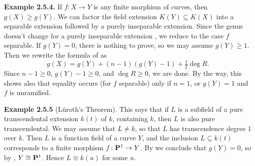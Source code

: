 {\medskip
\noindent\hypertarget{result-IV-2.5.4}{}\textbf{Example 2.5.4.} If $f\colon X\to Y$ is any finite morphism of curves, then $g(X)\geq g(Y)$. We can factor the field extension $K(Y)\subseteq K(X)$ into a separable extension followed by a purely inseparable extension. Since the genus doesn't change for a purely inseparable extension , we reduce to the case $f$ separable. If $g(Y)=0$, there is nothing to prove, so we may assume $g(Y)\geq1$. Then we rewrite the formula of  as
\[
g(X)=g(Y)+(n-1)(g(Y)-1)+\tfrac12\deg R.
\]
Since $n-1\geq0$, $g(Y)-1\geq0$, and $\deg R\geq0$, we are done. By the way, this shows also that equality occurs (for $f$ separable) only if $n=1$, or $g(Y)=1$ and $f$ is unramified.

\medskip
\noindent\hypertarget{result-IV-2.5.5}{}\textbf{Example 2.5.5} (L\"uroth's Theorem). This says that if $L$ is a subfield of a pure transcendental extension $k(t)$ of $k$, containing $k$, then $L$ is also pure transcendental. We may assume that $L\ne k$, so that $L$ has transcendence degree $1$ over $k$. Then $L$ is a function field of a curve $Y$, and the inclusion $L\subseteq k(t)$ corresponds to a finite morphism $f\colon\mathbf{P}^1\to Y$. By  we conclude that $g(Y)=0$, so by , $Y\cong\mathbf{P}^1$. Hence $L\cong k(u)$ for some $u$.
}
